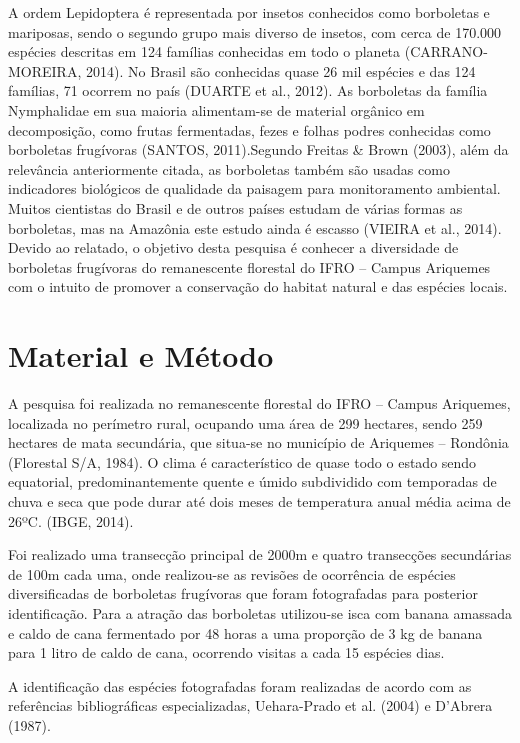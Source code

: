 \documentclass[article,12pt,onesidea,4paper,english,brazil]{abntex2}
\begin{document}
A ordem Lepidoptera é representada por insetos conhecidos como borboletas e mariposas, sendo o segundo grupo mais diverso de insetos, com cerca de 170.000 espécies descritas em 124 famílias conhecidas em todo o planeta (CARRANO- MOREIRA, 2014). No Brasil são conhecidas quase 26 mil espécies e das 124 famílias, 71 ocorrem no país (DUARTE et al., 2012). As borboletas da família Nymphalidae em sua maioria alimentam-se de material orgânico em decomposição, como frutas fermentadas, fezes e folhas podres conhecidas como borboletas frugívoras (SANTOS, 2011).Segundo Freitas \& Brown (2003), além da relevância anteriormente citada, as borboletas também são usadas como indicadores biológicos de qualidade da paisagem para monitoramento ambiental. Muitos cientistas do Brasil e de outros países estudam de várias formas as borboletas, mas na Amazônia este estudo ainda é escasso (VIEIRA et al., 2014). Devido ao relatado, o objetivo desta pesquisa é conhecer a diversidade de borboletas frugívoras do remanescente florestal do IFRO – Campus Ariquemes com o intuito de promover a conservação do habitat natural e das espécies locais.

	
	\section*{Material e Método}
	
	A pesquisa foi realizada no remanescente florestal do IFRO – Campus Ariquemes, localizada no perímetro rural, ocupando uma área de 299 hectares, sendo 259 hectares de mata secundária, que situa-se no município de Ariquemes – Rondônia (Florestal S/A, 1984). O clima é característico de quase todo o estado sendo equatorial, predominantemente quente e úmido subdividido com temporadas de chuva e seca que pode durar até dois meses de temperatura anual média acima de 26ºC. (IBGE, 2014).
	
	Foi realizado uma transecção principal de 2000m e quatro transecções secundárias de 100m cada uma, onde realizou-se as revisões de ocorrência de espécies diversificadas de borboletas frugívoras que foram fotografadas para posterior identificação. Para a atração das borboletas utilizou-se isca com banana amassada e caldo de cana fermentado por 48 horas a uma proporção de 3 kg de banana para 1 litro de caldo de cana, ocorrendo visitas a cada 15 espécies dias.
	
	A identificação das espécies fotografadas foram realizadas de acordo com as referências bibliográficas especializadas, Uehara-Prado et al. (2004) e D’Abrera (1987).
	
\end{document}
